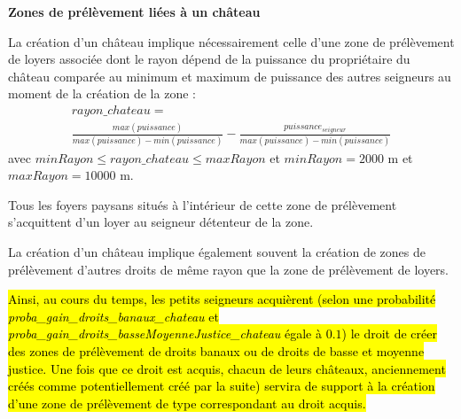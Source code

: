 \documentclass[a4paper,11pt]{article}
\begin{document}
{\bigskip
\textbf{Zones de prélèvement liées à un château}

La création d'un château implique nécessairement celle d'une zone de prélèvement de loyers associée dont le rayon dépend de la puissance du propriétaire du château comparée au minimum et maximum de puissance des autres seigneurs au moment de la création de la zone :
\begin{equation}
\begin{gathered}
rayon\_chateau =\\
\frac{max(puissance)}{max(puissance) - min(puissance)} - \frac{puissance_{seigneur}}{max(puissance)- min(puissance)}
\end{gathered}
\end{equation}
avec $minRayon \leq rayon\_chateau \leq maxRayon$ et $minRayon = 2 000$ m et $maxRayon = 10 000$ m.

Tous les foyers paysans situés à l'intérieur de cette zone de prélèvement s'acquittent d'un loyer au seigneur détenteur de la zone.

\bigskip
La création d'un château implique également souvent la création de zones de prélèvement d'autres droits de même rayon que la zone de prélèvement de loyers.
\begin{sloppypar}
\hl{Ainsi, au cours du temps, les petits seigneurs acquièrent (selon une probabilité \textit{proba\_gain\_droits\_banaux\_chateau} et \textit{proba\_gain\_droits\_basseMoyenneJustice\_chateau} égale à $0.1$) le droit de créer des zones de prélèvement de droits banaux ou de droits de basse et moyenne justice. Une fois que ce droit est acquis, chacun de leurs châteaux, anciennement créés comme potentiellement créé par la suite) servira de support à la création d'une zone de prélèvement de type correspondant au droit acquis.}
\end{sloppypar}

\medskip

}
\end{document}

